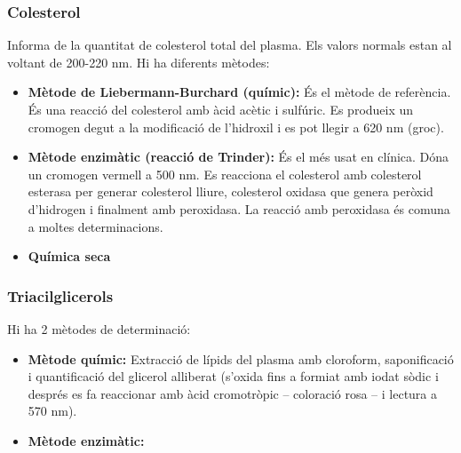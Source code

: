 \subsubsection{Colesterol}
\label{sec:colesterol}
Informa de la quantitat de colesterol total del plasma. Els valors
normals estan al voltant de 200-220 nm. Hi ha diferents mètodes:
\begin{itemize}
\item \textbf{Mètode de Liebermann-Burchard (químic):} És el mètode de
  referència. És una reacció del colesterol amb àcid acètic i
  sulfúric. Es produeix un cromogen degut a la modificació de
  l'hidroxil i es pot llegir a 620 nm (groc).

\item \textbf{Mètode enzimàtic (reacció de Trinder):} És el més usat en
  clínica. Dóna un cromogen vermell a 500 nm. Es reacciona el
  colesterol amb colesterol esterasa per generar colesterol lliure,
  colesterol oxidasa que genera peròxid d'hidrogen i finalment amb
  peroxidasa. La reacció amb peroxidasa és comuna a moltes
  determinacions.

\item \textbf{Química seca}
\end{itemize}

\subsubsection{Triacilglicerols}
\label{sec:triacilglicerols}
Hi ha 2 mètodes de determinació:
\begin{itemize}
\item \textbf{Mètode químic:} Extracció de lípids del plasma amb cloroform,
  saponificació i quantificació del glicerol alliberat (s'oxida fins a
  formiat amb iodat sòdic i després es fa reaccionar amb àcid
  cromotròpic – coloració rosa – i lectura a 570 nm).

\item \textbf{Mètode enzimàtic:}
\end{itemize}


